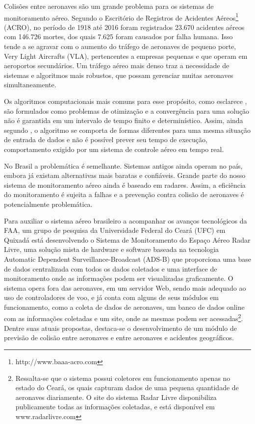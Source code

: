 
Colisões entre aeronaves são um grande problema para os sistemas de monitoramento aéreo. Segundo o Escritório de Registros de Acidentes Aéreos\footnote{http://www.baaa-acro.com} (ACRO), no período de 1918 até 2016 foram registrados 23.670 acidentes aéreos com 146.726 mortes, dos quais 7.625 foram causados por falha humana. Isso tende a se agravar com o aumento do tráfego de aeronaves de pequeno porte, Very Light Aircrafts (VLA), pertencentes a empresas pequenas e que operam em aeroportos secundários. Um tráfego aéreo mais denso traz a necessidade de sistemas e algoritmos mais robustos, que possam gerenciar muitas aeronaves simultaneamente.

Os algoritmos computacionais mais comuns para esse propósito, como esclarece , são formulados como problemas de otimização e a convergência para uma solução não é garantida em um intervalo de tempo finito e determinístico. Assim, ainda segundo , o algoritmo se comporta de formas diferentes para uma mesma situação de entrada de dados e não é possível prever seu tempo de execução, comportamento exigido por um sistema de controle aéreo em tempo real.

No Brasil a problemática é semelhante. Sistemas antigos ainda operam no país, embora já existam alternativas mais baratas e confiáveis. Grande parte do nosso sistema de monitoramento aéreo ainda é baseado em radares. Assim, a eficiência do monitoramento é sujeita a falhas e a prevenção contra colisão de aeronaves é potencialmente problemática. 

Para auxiliar o sistema aéreo brasileiro a acompanhar os avanços tecnológicos da FAA, um grupo de pesquisa da Universidade Federal do Ceará (UFC) em Quixadá está desenvolvendo o Sistema de Monitoramento do Espaço Aéreo Radar Livre, uma solução mista de hardware e software baseada na tecnologia Automatic Dependent Surveillance-Broadcast (ADS-B) que proporciona uma base de dados centralizada com todos os dados coletados e uma interface de monitoramento onde as informações podem ser visualizadas graficamente. O sistema opera fora das aeronaves, em um servidor Web, sendo mais adequado ao uso de controladores de voo, e já conta com alguns de seus módulos em funcionamento, como a coleta de dados de aeronaves, um banco de dados online com as informações coletadas e um site, onde as mesmas podem ser acessadas\footnote{Ressalta-se que o sistema possui coletores em funcionamento apenas no estado do Ceará, os quais capturam dados de uma pequena quantidade de aeronaves diariamente. O site do sistema Radar Livre disponibiliza publicamente todas as informações coletadas, e está disponível em www.radarlivre.com}. Dentre suas atuais propostas, destaca-se o desenvolvimento de um módulo de previsão de colisão entre aeronaves e entre aeronaves e acidentes geográficos. 

